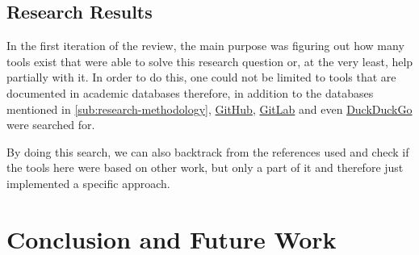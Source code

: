 \documentclass{article}
\begin{document}
\subsection{Research Results}

In the first iteration of the review, the main purpose was figuring out how
many tools exist that were able to solve this research question or, at the
very least, help partially with it. In order to do this, one could not be
limited to tools that are documented in academic databases therefore, in
addition to the databases mentioned in \ref{sub:research-methodology},
\href{https://github.com}{GitHub}, \href{https://gitlab.com}{GitLab} and even
\href{https://duckduckgo.org}{DuckDuckGo} were searched for.




By doing this search, we can also backtrack from the references used and
check if the tools here were based on other work, but only a part of it and
therefore just implemented a specific approach.


\section{Conclusion and Future Work}
\end{document}
